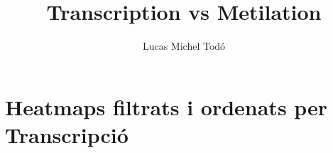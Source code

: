 \documentclass{article}\usepackage[]{graphicx}\usepackage[]{color}
\begin{document}
\title{Transcription vs Metilation}
\author{Lucas Michel Todó}
\maketitle
\tableofcontents
\clearpage







\section{Heatmaps filtrats i ordenats per Transcripció}
\end{document}
